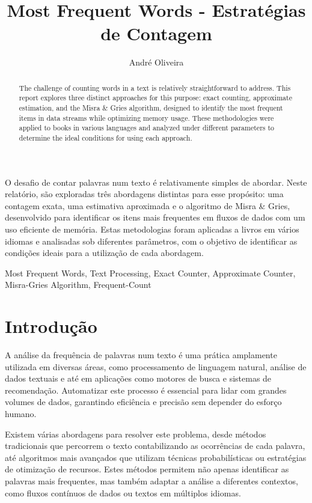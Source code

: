 \documentclass[shortpaper, portugues, times, mirror]{revdetua}
\begin{document}

\title{Most Frequent Words - Estratégias de Contagem}
\author{André Oliveira}
\maketitle

\begin{resumo}
O desafio de contar palavras num texto é relativamente simples de abordar. Neste relatório, são exploradas três abordagens distintas para esse propósito: uma contagem exata, uma estimativa aproximada e o algoritmo de Misra \& Gries, desenvolvido para identificar os itens mais frequentes em fluxos de dados com um uso eficiente de memória. Estas metodologias foram aplicadas a livros em vários idiomas e analisadas sob diferentes parâmetros, com o objetivo de identificar as condições ideais para a utilização de cada abordagem.
\end{resumo}

\begin{abstract}
The challenge of counting words in a text is relatively straightforward to address. This report explores three distinct approaches for this purpose: exact counting, approximate estimation, and the Misra \& Gries algorithm, designed to identify the most frequent items in data streams while optimizing memory usage. These methodologies were applied to books in various languages and analyzed under different parameters to determine the ideal conditions for using each approach.
\end{abstract}

\begin{keywords}
Most Frequent Words, Text Processing, Exact Counter, Approximate Counter, Misra-Gries Algorithm, Frequent-Count
\end{keywords}

\section{Introdução}
A análise da frequência de palavras num texto é uma prática amplamente utilizada em diversas áreas, como processamento de linguagem natural, análise de dados textuais e até em aplicações como motores de busca e sistemas de recomendação. Automatizar este processo é essencial para lidar com grandes volumes de dados, garantindo eficiência e precisão sem depender do esforço humano.

Existem várias abordagens para resolver este problema, desde métodos tradicionais que percorrem o texto contabilizando as ocorrências de cada palavra, até algoritmos mais avançados que utilizam técnicas probabilísticas ou estratégias de otimização de recursos. Estes métodos permitem não apenas identificar as palavras mais frequentes, mas também adaptar a análise a diferentes contextos, como fluxos contínuos de dados ou textos em múltiplos idiomas.
\end{document}
